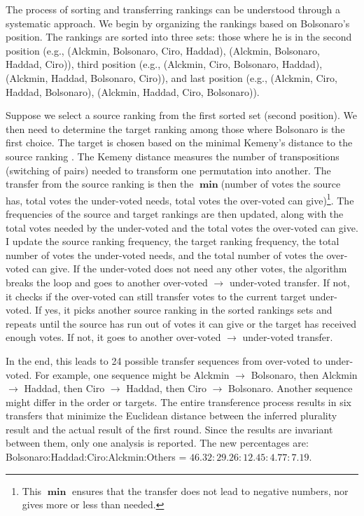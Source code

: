 \documentclass[hidelinks,11pt]{article} \usepackage[utf8]{inputenc}
\begin{document}
The process of sorting and transferring rankings can be understood through a systematic approach. We begin by organizing the rankings based on Bolsonaro's position. The rankings are sorted into three sets: those where he is in the second position (e.g., (Alckmin, Bolsonaro, Ciro, Haddad), (Alckmin, Bolsonaro, Haddad, Ciro)), third position (e.g., (Alckmin, Ciro, Bolsonaro, Haddad), (Alckmin, Haddad, Bolsonaro, Ciro)), and last position (e.g., (Alckmin, Ciro, Haddad, Bolsonaro), (Alckmin, Haddad, Ciro, Bolsonaro)).

Suppose we select a source ranking from the first sorted set (second position).
We then need to determine the target ranking among those where Bolsonaro is the
first choice. The target is chosen based on the minimal Kemeny's distance to the
source ranking \parencite{nurmi2002voting}. The Kemeny distance measures the
number of transpositions (switching of pairs) needed to transform one
permutation into another. The transfer from the source ranking is then the
\(\operatorname{\mathbf{min}}\)(number of votes the source has, total votes the
under-voted needs, total votes the over-voted can give)\footnote{This
  \(\operatorname{\mathbf{min}}\) ensures that the transfer does not lead to
  negative numbers, nor gives more or less than needed.}. The frequencies of the
source and target rankings are then updated, along with the total votes needed
by the under-voted and the total votes the over-voted can give. I update the
source ranking frequency, the target ranking frequency, the total number of
votes the under-voted needs, and the total number of votes the over-voted can
give. If the under-voted does not need any other votes, the algorithm breaks the
loop and goes to another over-voted \(\to\) under-voted transfer. If not, it
checks if the over-voted can still transfer votes to the current target
under-voted. If yes, it picks another source ranking in the sorted rankings sets
and repeats until the source has run out of votes it can give or the target has
received enough votes. If not, it goes to another over-voted \(\to\) under-voted
transfer.


In the end, this leads to 24 possible transfer sequences from over-voted to
under-voted. For example, one sequence might be Alckmin \(\to\) Bolsonaro, then
Alckmin \(\to\) Haddad, then Ciro \(\to\) Haddad, then Ciro \(\to\) Bolsonaro.
Another sequence might differ in the order or targets. The entire transference
process results in six transfers that minimize the Euclidean distance between
the inferred plurality result and the actual result of the first round. Since
the results are invariant between them, only one analysis is reported. The new
percentages are: Bolsonaro:Haddad:Ciro:Alckmin:Others =
\(46.32:29.26:12.45:4.77:7.19\).
\end{document}

